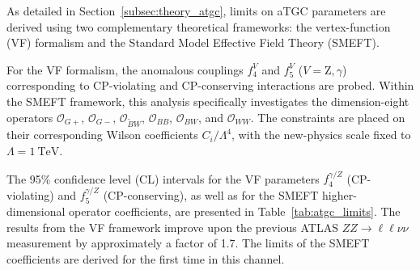 As detailed in Section~\ref{subsec:theory_atgc}, limits on aTGC parameters are derived using two complementary theoretical frameworks: the vertex-function (VF) formalism and the Standard Model Effective Field Theory (SMEFT). 

For the VF formalism, the anomalous couplings $f_4^V$ and $f_5^V$ ($V = \text{Z}, \gamma$) corresponding to CP-violating and CP-conserving interactions are probed. Within the SMEFT framework, this analysis specifically investigates the dimension-eight operators $\mathcal{O}_{G+}$, $\mathcal{O}_{G-}$, $\mathcal{O}_{\widetilde{B}W}$, $\mathcal{O}_{BB}$, $\mathcal{O}_{BW}$, and $\mathcal{O}_{WW}$. The constraints are placed on their corresponding Wilson coefficients $C_i/\Lambda^4$, with the new-physics scale fixed to $\Lambda = 1~\text{TeV}$.

The 95\% confidence level (CL) intervals for the VF parameters $f_4^{\gamma/Z}$ (CP-violating) and $f_5^{\gamma/Z}$ (CP-conserving), as well as for the SMEFT higher-dimensional operator coefficients, are presented in Table~\ref{tab:atgc_limits}. The results from the VF framework improve upon the previous ATLAS $ZZ \to \ell\ell\nu\nu$ measurement by approximately a factor of 1.7. The limits of the SMEFT coefficients are derived for the first time in this channel.

